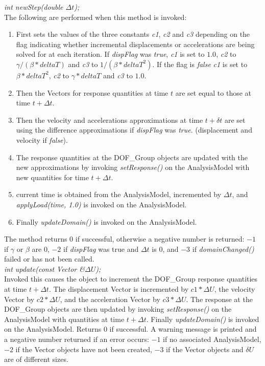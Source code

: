 {\em int newStep(double $\Delta t$);}\\
The following are performed when this method is invoked:
\begin{enumerate}
\item First sets the values of the three constants {\em c1}, {\em c2}
and {\em c3} depending on the flag indicating whether incremental
displacements or accelerations are being solved for at each iteration.
If {\em dispFlag} was {\em true}, {\em c1} is set to $1.0$, {\em c2} to $
\gamma / (\beta * deltaT)$ and {\em c3} to $1/ (\beta * deltaT^2)$. If
the flag is {\em false} {\em c1} is set to $\beta * deltaT^2$, {\em c2} to $
\gamma * deltaT$ and {\em c3} to $1.0$. 
\item Then the Vectors for response quantities at time $t$ are set
equal to those at time $t + \Delta t$.
\item Then the velocity and accelerations approximations at time $t +
\delta t$ are set using the difference approximations if {\em
dispFlag} was {\em true}. (displacement and velocity if {\em false}).
\item The response quantities at the DOF\_Group objects are updated
with the new approximations by invoking {\em setResponse()} on the
AnalysisModel with new quantities for time $t + \Delta t$.
\item current time is obtained from the AnalysisModel, incremented by
$\Delta t$, and {\em applyLoad(time, 1.0)} is invoked on the
AnalysisModel. 
\item Finally {\em updateDomain()} is invoked on the AnalysisModel.
\end{enumerate}
The method returns $0$ if successful, otherwise a negative number is
returned: $-1$ if $\gamma$ or $\beta$ are $0$, $-2$ if {\em dispFlag}
was true and $\Delta t$ is $0$, and $-3$ if {\em domainChanged()}
failed or has not been called. \\

{\em int update(const Vector \&$\Delta U$);} \\
Invoked this causes the object to increment the DOF\_Group
response quantities at time $t + \Delta t$. The displacement Vector is  
incremented by $ c1 * \Delta U$, the velocity Vector by $
c2 * \Delta U$, and the acceleration Vector by $c3 * \Delta U$. 
The response at the DOF\_Group objects are then updated by invoking
{\em setResponse()} on the AnalysisModel with quantities at time $t +
\Delta t$. Finally {\em updateDomain()} is invoked on the
AnalysisModel. Returns
$0$ if successful. A warning message is printed and a negative number
returned if an error occurs: $-1$ if no associated AnalysisModel, $-2$
if the Vector objects have not been created, $-3$ if the Vector
objects and $\delta U$ are of different sizes. \\

